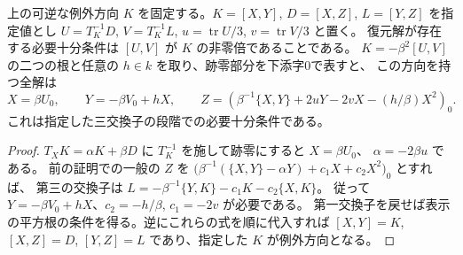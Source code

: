 \begin{proposition}\label{prop:invertible-defect-bracket-parameters}
上の可逆な例外方向 $K$ を固定する。$K=[X,Y]$, $D=[X,Z]$, $L=[Y,Z]$ を指定値とし
$U=T_K^{-1}D$, $V=T_K^{-1}L$, $u=\operatorname{tr}U/3$, $v=\operatorname{tr}V/3$ と置く。
復元解が存在する必要十分条件は $[U,V]$ が $K$ の非零倍であることである。
$K=-\beta^2[U,V]$ の二つの根と任意の $h\in k$ を取り、跡零部分を下添字0で表すと、
この方向を持つ全解は
\[
 X=\beta U_0,\qquad Y=-\beta V_0+hX,\qquad
 Z=\left(\beta^{-1}\{X,Y\}+2uY-2vX-(h/\beta)X^2\right)_0 .
\]
これは指定した三交換子の段階での必要十分条件である。
\end{proposition}
\begin{proof}
$T_X K=\alpha K+\beta D$ に $T_K^{-1}$ を施して跡零にすると $X=\beta U_0$、
$\alpha=-2\beta u$ である。
前の証明での一般の $Z$ を
$\big(\beta^{-1}(\{X,Y\}-\alpha Y)+c_1X+c_2X^2\big)_0$ とすれば、
第三の交換子は $L=-\beta^{-1}\{Y,K\}-c_1 K-c_2\{X,K\}$。
従って $Y=-\beta V_0+hX$、$c_2=-h/\beta$, $c_1=-2v$ が必要である。
第一交換子を戻せば表示の平方根の条件を得る。逆にこれらの式を順に代入すれば
$[X,Y]=K$, $[X,Z]=D$, $[Y,Z]=L$ であり、指定した $K$ が例外方向となる。
\end{proof}
